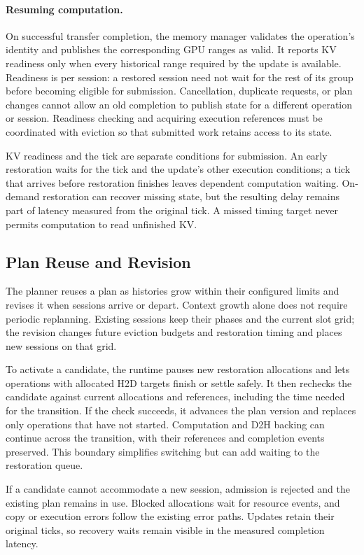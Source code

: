 \paragraph{Resuming computation.}
On successful transfer completion, the memory manager validates the operation's identity and publishes the corresponding GPU ranges as valid.
It reports KV readiness only when every historical range required by the update is available.
Readiness is per session: a restored session need not wait for the rest of its group before becoming eligible for submission.
Cancellation, duplicate requests, or plan changes cannot allow an old completion to publish state for a different operation or session.
Readiness checking and acquiring execution references must be coordinated with eviction so that submitted work retains access to its state.

KV readiness and the tick are separate conditions for submission.
An early restoration waits for the tick and the update's other execution conditions; a tick that arrives before restoration finishes leaves dependent computation waiting.
On-demand restoration can recover missing state, but the resulting delay remains part of latency measured from the original tick.
A missed timing target never permits computation to read unfinished KV.

\subsection{Plan Reuse and Revision}
\label{sec:design-revisions}

The planner reuses a plan as histories grow within their configured limits and revises it when sessions arrive or depart.
Context growth alone does not require periodic replanning.
Existing sessions keep their phases and the current slot grid; the revision changes future eviction budgets and restoration timing and places new sessions on that grid.

To activate a candidate, the runtime pauses new restoration allocations and lets operations with allocated H2D targets finish or settle safely.
It then rechecks the candidate against current allocations and references, including the time needed for the transition.
If the check succeeds, it advances the plan version and replaces only operations that have not started.
Computation and D2H backing can continue across the transition, with their references and completion events preserved.
This boundary simplifies switching but can add waiting to the restoration queue.

If a candidate cannot accommodate a new session, admission is rejected and the existing plan remains in use.
Blocked allocations wait for resource events, and copy or execution errors follow the existing error paths.
Updates retain their original ticks, so recovery waits remain visible in the measured completion latency.
